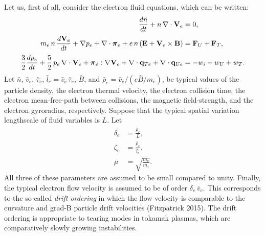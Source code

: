 \documentclass[notitlepage,12pt]{article}
\newcommand{\bpi}{\mbox{\boldmath$\pi$}}
\begin{document}
Let us, first of all, consider the electron fluid equations, which can
be written:
\begin{align}
\frac{dn}{dt} + n\,\nabla\cdot{\bf V}_e &= 0,\\[0.5ex]
m_e\, n\,\frac{d {\bf V}_e}{dt} + \nabla p_e+ \nabla\cdot \bpi_e + e\, n\,
({\bf E} + {\bf V}_e\times {\bf B})& = {\bf F}_U +{\bf F}_T,\\[0.5ex]
\frac{3}{2}\frac{d p_e}{dt} + \frac{5}{2}\,p_e\,\nabla\cdot{\bf V}_e
+ \bpi_e:\nabla{\bf V}_e+ \nabla\cdot{\bf q}_{Te} 
+ \nabla\cdot{\bf q}_{Ue} &= -w_i+w_U + w_T.
\end{align}
Let $\bar{n}$, $\bar{v}_e$, $\bar{\tau}_e$, $\bar{l}_e=\bar{v}_e\,\bar{\tau}_e$, $\bar{B}$,
and $\bar{\rho}_e =\bar{ v}_e/(e\bar{B}/m_e)$,  be typical values
of the particle density, the electron thermal velocity, the electron collision time, the electron
mean-free-path between collisions,  the magnetic field-strength, and the
electron gyroradius,  respectively. 
Suppose that the typical spatial variation lengthscale of fluid variables is $L$. Let
 \begin{align}
\delta_e &=\frac{\bar{\rho}_e}{L},\\[0.5ex]
\zeta_e &= \frac{\bar{\rho}_e}{\bar{l}_e},\\[0.5ex]
\mu &= \sqrt{\frac{m_e}{m_i}}.
\end{align}
All three of these parameters are assumed to be  small
compared to unity. Finally, the typical electron flow velocity is assumed to be of order $\delta_e\,\bar{v}_e$. This corresponds
to the so-called {\em drift ordering}\/ in which the flow velocity is comparable to the curvature and grad-B particle
drift velocities (Fitzpatrick 2015). The drift ordering is appropriate to tearing modes in tokamak plasmas, which are comparatively
slowly growing instabilities. 
\end{document}
